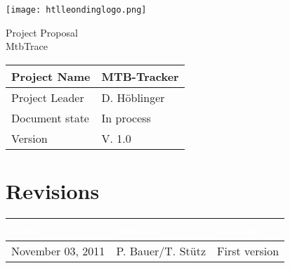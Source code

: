 \documentclass[12pt]{article}
\theoremstyle{definition}
\newcommand{\projectname}{MTB-Tracker}
\newcommand{\productname}{MtbTrace}
\newcommand{\projectleader}{D. Höblinger}
\newcommand{\documentstatus}{In process}
\newcommand{\version}{V. 1.0}
\begin{document}
\begin{titlepage}
\begin{flushright}
\texttt{[image: htlleondinglogo.png]}\\
\end{flushright}

\vspace{10em}

\begin{center}
{\Huge Project Proposal} \\[3em]
{\LARGE \productname} \\[3em]
\end{center}

\begin{flushleft}
\begin{tabular}{|l|l|}
\hline
Project Name & \projectname \\ \hline
Project Leader & \projectleader \\ \hline
Document state & \documentstatus \\ \hline
Version & \version \\ \hline
\end{tabular}
\end{flushleft}

\end{titlepage}
\section*{Revisions}
\begin{tabular}{|l|l|l|}
\hline
\cellcolor[gray]{0.5}\textcolor{white}{Date} & \cellcolor[gray]{0.5}\textcolor{white}{Author} & \cellcolor[gray]{0.5}\textcolor{white}{Change} \\ \hline
November 03, 2011&P. Bauer/T. Stütz&First version \\ \hline
\end{tabular}
\pagebreak

\tableofcontents
\pagebreak
\end{document}
